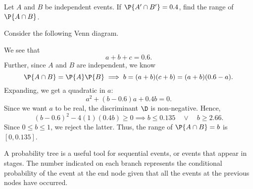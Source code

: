 \begin{sample}
    Let $A$ and $B$ be independent events. If $\P{A' \cap B'} = 0.4$, find the range of $\P{A \cap B}$.
\end{sample}
\begin{sampans}
    Consider the following Venn diagram.
    \begin{figure}[H]
        \centering
        \caption{}
    \end{figure}
    We see that \[a + b + c = 0.6. \tag{$\ast$}\] Further, since $A$ and $B$ are independent, we know \[\P{A \cap B} = \P{A} \P{B} \implies b = (a+b)(c+b) = (a+b)(0.6 - a).\] Expanding, we get a quadratic in $a$: \[a^2 + (b - 0.6)a + 0.4 b = 0.\] Since we want $a$ to be real, the discriminant $\D$ is non-negative. Hence, \[(b-0.6)^2 - 4(1)(0.4b) \geq 0 \implies b \leq 0.135 \quad \lor \quad b \geq 2.66.\] Since $0 \leq b \leq 1$, we reject the latter. Thus, the range of $\P{A \cap B} = b$ is $[0, 0.135]$.
\end{sampans}

\begin{recipe}
    A probability tree is a useful tool for sequential events, or events that appear in stages. The number indicated on each branch represents the conditional probability of the event at the end node given that all the events at the previous nodes have occurred.
\end{recipe}

